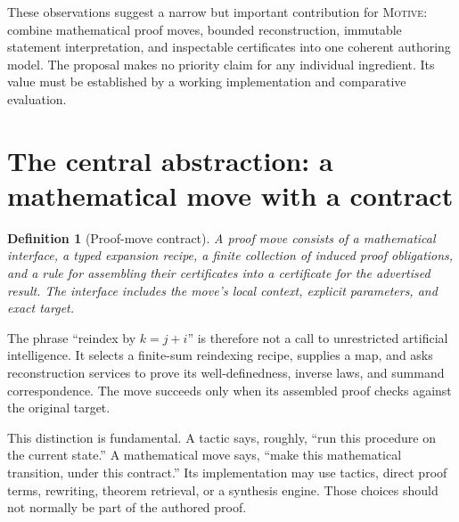 \documentclass[11pt,a4paper]{article}
\newcommand{\Motive}{\textnormal{\textsc{Motive}}}
\newtheorem{definition}[proposition]{Definition}
\theoremstyle{remark}
\begin{document}
These observations suggest a narrow but important contribution for \Motive: combine mathematical proof moves, bounded reconstruction, immutable statement interpretation, and inspectable certificates into one coherent authoring model. The proposal makes no priority claim for any individual ingredient. Its value must be established by a working implementation and comparative evaluation.

\section{The central abstraction: a mathematical move with a contract}
\label{sec:contract}
\begin{definition}[Proof-move contract]
A proof move consists of a mathematical interface, a typed expansion recipe, a finite collection of induced proof obligations, and a rule for assembling their certificates into a certificate for the advertised result. The interface includes the move's local context, explicit parameters, and exact target.
\end{definition}
The phrase ``reindex by $k=j+i$'' is therefore not a call to unrestricted artificial intelligence. It selects a finite-sum reindexing recipe, supplies a map, and asks reconstruction services to prove its well-definedness, inverse laws, and summand correspondence. The move succeeds only when its assembled proof checks against the original target.

This distinction is fundamental. A tactic says, roughly, ``run this procedure on the current state.'' A mathematical move says, ``make this mathematical transition, under this contract.'' Its implementation may use tactics, direct proof terms, rewriting, theorem retrieval, or a synthesis engine. Those choices should not normally be part of the authored proof.
\end{document}
